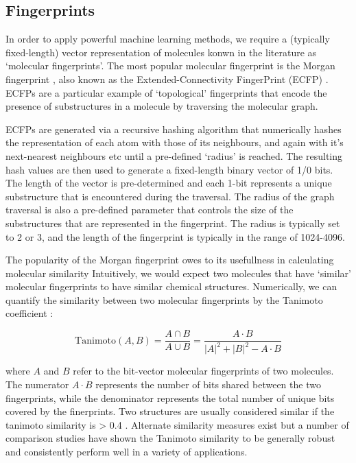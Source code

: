 \subsection{Fingerprints} \label{subsec:fingerprints}

In order to apply powerful machine learning methods, we require a (typically fixed-length) vector representation of molecules konwn in the literature as `molecular fingerprints'. The most popular molecular fingerprint is the Morgan fingerprint \cite{morgan1965fingerprints}, also known as the Extended-Connectivity FingerPrint (ECFP) \cite{rogers2010extended}. ECFPs are a particular example of `topological' fingerprints that encode the presence of substructures in a molecule by traversing the molecular graph.

ECFPs are generated via a recursive hashing algorithm that numerically hashes the representation of each atom with those of its neighbours, and again with it's next-nearest neighbours etc until a pre-defined `radius' is reached. The resulting hash values are then used to generate a fixed-length binary vector of 1/0 bits. The length of the vector is pre-determined and each 1-bit represents a unique substructure that is encountered during the traversal. The radius of the graph traversal is also a pre-defined parameter that controls the size of the substructures that are represented in the fingerprint. The radius is typically set to 2 or 3, and the length of the fingerprint is typically in the range of 1024-4096.

The popularity of the Morgan fingerprint owes to its usefullness in calculating molecular similarity \cite{Maggiora2014similarity}Intuitively, we would expect two molecules that have `similar' molecular fingerprints to have similar chemical structures. Numerically, we can quantify the similarity between two molecular fingerprints by the Tanimoto coefficient \cite{Willet1998similarity}:

\begin{equation} \label{eqn:tanimoto}
    \mathrm{Tanimoto}(A, B) = \frac{A \cap B}{A \cup B} = \frac{A \cdot B}{|A|^{2} + |B|^{2} - A \cdot B}
\end{equation}

where $A$ and $B$ refer to the bit-vector molecular fingerprints of two molecules. The numerator $A \cdot B$ represents the number of bits shared between the two fingerprints, while the denominator represents the total number of unique bits covered by the finerprints. Two structures are usually considered similar if the tanimoto similarity is > 0.4 \cite{baldi2010similarity}. Alternate similarity measures exist but a number of comparison studies \cite{Todeschini2012tanimoto, Bajusz2015Tanimoto} have shown the Tanimoto similarity to be generally robust and consistently perform well in a variety of applications.

